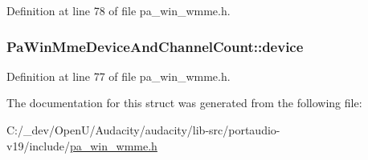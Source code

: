 Definition at line 78 of file pa\+\_\+win\+\_\+wmme.\+h.

\subsubsection[{\texorpdfstring{device}{device}}]{ Pa\+Win\+Mme\+Device\+And\+Channel\+Count\+::device}\hypertarget{struct_pa_win_mme_device_and_channel_count_afeb111df3482e661fa903bbc0ee0f908}{}\label{struct_pa_win_mme_device_and_channel_count_afeb111df3482e661fa903bbc0ee0f908}


Definition at line 77 of file pa\+\_\+win\+\_\+wmme.\+h.



The documentation for this struct was generated from the following file\+:\begin{DoxyCompactItemize}
\item 
C\+:/\+\_\+dev/\+Open\+U/\+Audacity/audacity/lib-\/src/portaudio-\/v19/include/\hyperlink{pa__win__wmme_8h}{pa\+\_\+win\+\_\+wmme.\+h}\end{DoxyCompactItemize}
